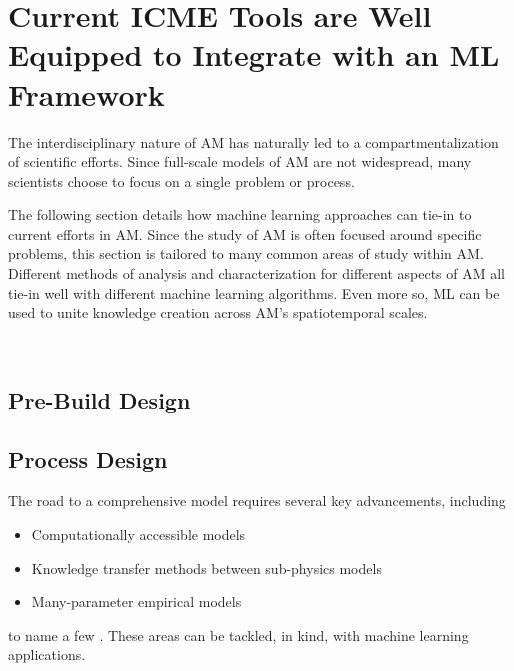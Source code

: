 \section{Current ICME Tools are Well Equipped to Integrate with an ML Framework}
The interdisciplinary nature of AM has naturally led to a compartmentalization of scientific efforts. Since full-scale models of AM are not widespread, many scientists choose to focus on a single problem or process. 

The following section details how machine learning approaches can tie-in to current efforts in AM. Since the study of AM is often focused around specific problems, this section is tailored to many common areas of study within AM. Different methods of analysis and characterization for different aspects of AM all tie-in well with different machine learning algorithms. Even more so, ML can be used to unite knowledge creation across AM's spatiotemporal scales.

~%
\subsection{Pre-Build Design}





\subsection{Process Design}
The road to a comprehensive model requires several key advancements, including
\begin{itemize}
	\item Computationally accessible models
	\item Knowledge transfer methods between sub-physics models
	\item Many-parameter empirical models
\end{itemize}
to name a few \cite{King2015}. These areas can be tackled, in kind, with machine learning applications.
	





